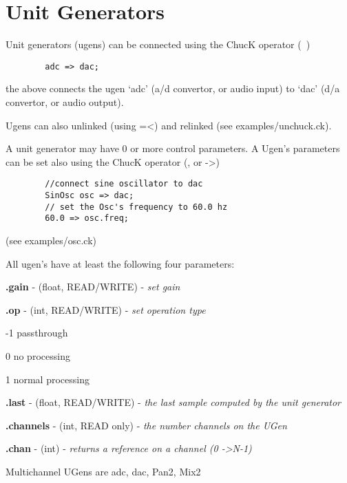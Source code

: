 \chapter{Unit Generators}

Unit generators (ugens) can be connected using the ChucK operator (~\chuckop)

\example
\begin{verbatim}
        adc => dac;
\end{verbatim}

the above connects the ugen `adc' (a/d convertor, or audio input) to `dac'  
(d/a convertor, or audio output).

Ugens can also unlinked (using =\textless) and relinked (see examples/unchuck.ck). 

A unit generator may have 0 or more control parameters.  
A Ugen's parameters can be set also using the ChucK operator (\chuckop, or -\textgreater) 

\example

\begin{verbatim}
        //connect sine oscillator to dac
        SinOsc osc => dac;
        // set the Osc's frequency to 60.0 hz
        60.0 => osc.freq;
\end{verbatim}
  (see examples/osc.ck)

\newpage

All ugen's have at least the following four parameters:

\control
\begin{chuckitemize}
\item {\bf .gain} - (float, READ/WRITE) - {\it set gain} 
\item {\bf .op} - (int, READ/WRITE) - {\it set operation type }
  \begin{chuckitemize}
    \item -1 passthrough 
    \item 0 no processing 
    \item 1 normal processing
  \end{chuckitemize}
\item {\bf .last} - (float, READ/WRITE) - {\it the last sample computed by the unit generator}
\item {\bf .channels} - (int, READ only) - {\it the number channels on the UGen}
\item {\bf .chan} - (int) - {\it returns a reference on a channel (0 -\textgreater N-1)}
\end{chuckitemize}

Multichannel UGens are adc, dac, Pan2, Mix2

